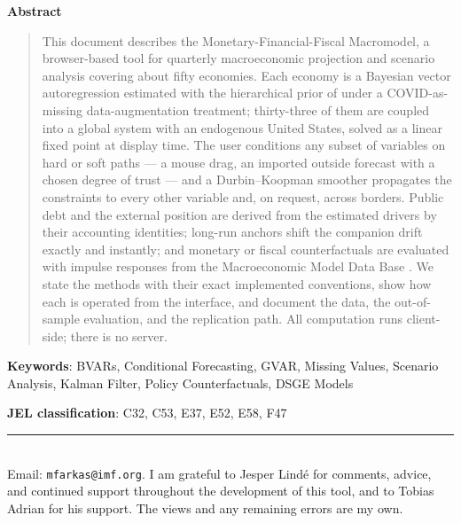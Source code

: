 \documentclass[11pt]{article}
\theoremstyle{plain}
\theoremstyle{remark}
\begin{document}
\vspace{0.8cm}
\begin{center}\textbf{Abstract}\end{center}
\begin{quote}
This document describes the Monetary-Financial-Fiscal Macromodel, a browser-based
tool for quarterly macroeconomic projection and scenario analysis
covering about fifty economies. Each economy is a Bayesian vector
autoregression estimated with the hierarchical prior of
\citet{Giannone2015} under a COVID-as-missing data-augmentation
treatment; thirty-three of them are coupled into a global system with an
endogenous United States, solved as a linear fixed point at display
time. The user conditions any subset of variables on hard or soft paths
--- a mouse drag, an imported outside forecast with a chosen degree of
trust --- and a Durbin--Koopman smoother
\citep{DurbinKoopman2002} propagates the constraints to every other
variable and, on request, across borders. Public debt and the external
position are derived from the estimated drivers by their accounting
identities; long-run anchors shift the companion drift exactly and
instantly; and monetary or fiscal counterfactuals are evaluated with
impulse responses from the Macroeconomic Model Data Base
\citep{WielandCwikMuellerSchmidtWolters2012}. We state the methods with
their exact implemented conventions, show how each is operated from the
interface, and document the data, the out-of-sample evaluation, and the
replication path. All computation runs client-side; there is no server.
\end{quote}

\vspace{0.4cm}
\noindent\textbf{Keywords}: BVARs, Conditional Forecasting, GVAR, Missing
Values, Scenario Analysis, Kalman Filter, Policy Counterfactuals, DSGE
Models

\vspace{0.2cm}
\noindent\textbf{JEL classification}: C32, C53, E37, E52, E58, F47

\vfill
\noindent\rule{\textwidth}{0.4pt}\\[4pt]
{\footnotesize Email: \texttt{mfarkas@imf.org}. I am grateful to Jesper
Lind\'e for comments, advice, and continued support throughout the
development of this tool, and to Tobias Adrian for his support. The
views and any remaining errors are my own.}

\clearpage
\tableofcontents
\clearpage

\end{document}
